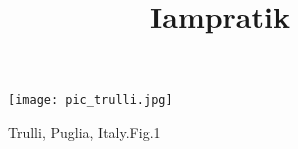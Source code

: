 \documentclass{article}
\title{Iampratik}
\begin{document}
\begin{figure}
\texttt{[image: pic\_trulli.jpg]}
\caption{ Trulli, Puglia, Italy.Fig.1 }
\end{figure}

\Alpha
\end{document}
